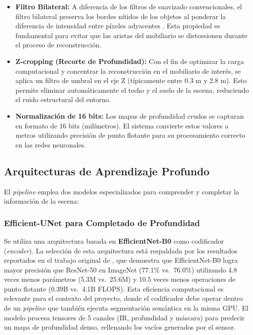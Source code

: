 \documentclass[12pt, a4, twoside, openany]{report}
\begin{document}
\begin{itemize}
    \item \textbf{Filtro Bilateral:} A diferencia de los filtros de suavizado convencionales, el filtro bilateral preserva los bordes nítidos de los objetos al ponderar la diferencia de intensidad entre píxeles adyacentes \cite{paris2022survey}. Esta propiedad es fundamental para evitar que las aristas del mobiliario se distorsionen durante el proceso de reconstrucción.
    \item \textbf{Z-cropping (Recorte de Profundidad):} Con el fin de optimizar la carga computacional y concentrar la reconstrucción en el mobiliario de interés, se aplica un filtro de umbral en el eje Z (típicamente entre 0.3 m y 2.8 m). Esto permite eliminar automáticamente el techo y el suelo de la escena, reduciendo el ruido estructural del entorno.
    \item \textbf{Normalización de 16 bits:} Los mapas de profundidad crudos se capturan en formato de 16 bits (milímetros). El sistema convierte estos valores a metros utilizando precisión de punto flotante para su procesamiento correcto en las redes neuronales.
\end{itemize}

\subsection{Arquitecturas de Aprendizaje Profundo}

El \textit{pipeline} emplea dos modelos especializados para comprender y completar la información de la escena:

\subsubsection{Efficient-UNet para Completado de Profundidad}

Se utiliza una arquitectura basada en \textbf{EfficientNet-B0} como codificador (\textit{encoder}). La selección de esta arquitectura está respaldada por los resultados reportados en el trabajo original de \cite{tan2019efficientnet}, que demuestra que EfficientNet-B0 logra mayor precisión que ResNet-50 en ImageNet (77.1\% vs.\ 76.0\%) utilizando 4.8 veces menos parámetros (5.3M vs.\ 25.6M) y 10.5 veces menos operaciones de punto flotante (0.39B vs.\ 4.1B FLOPS). Esta eficiencia computacional es relevante para el contexto del proyecto, donde el codificador debe operar dentro de un \textit{pipeline} que también ejecuta segmentación semántica en la misma GPU. El modelo procesa tensores de 5 canales (IR, profundidad y máscara) para predecir un mapa de profundidad denso, rellenando los vacíos generados por el sensor.
\end{document}
